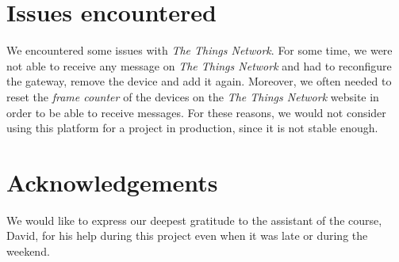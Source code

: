 \documentclass[11pt]{article}
\begin{document}
\section{Issues encountered}

We encountered some issues with \textit{The Things Network}. For some time, we were not able to receive any message on \textit{The Things Network} and had to reconfigure the gateway, remove the device and add it again. Moreover, we often needed to reset the \textit{frame counter} of the devices on the \textit{The Things Network} website in order to be able to receive messages. For these reasons, we would not consider using this platform for a project in production, since it is not stable enough.

\section{Acknowledgements}

We would like to express our deepest gratitude to the assistant of the course, David, for his help during this project even when it was late or during the weekend.
\end{document}
